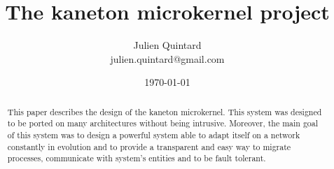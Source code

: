 \documentclass[10pt,a4wide]{article}
\title{The kaneton microkernel project}
\author{\small{Julien Quintard} \\
        \scriptsize{julien.quintard@gmail.com}}
\date{\scriptsize{\today}}
\begin{document}
\maketitle


\begin{abstract}

This paper describes the design of the kaneton microkernel.
This system was designed to be ported on many architectures without being
intrusive. Moreover, the main goal of this system was to design a powerful
system able to adapt itself on a network constantly in evolution and to
provide a transparent and easy way to migrate processes, communicate
with system's entities and to be fault tolerant.

\end{abstract}

%
%
\end{document}
